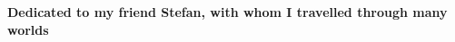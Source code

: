 \newpage
\begin{center}
\textbf{Dedicated to my friend Stefan, with whom I travelled through many worlds}
\end{center}
\newpage